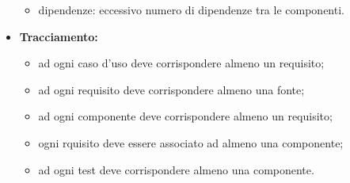 \begin{itemize}
\begin{itemize}
		\item dipendenze: eccessivo numero di dipendenze tra le componenti.
	\end{itemize}
	\item \textbf{Tracciamento:}
	\begin{itemize}
		\item ad ogni caso d'uso deve corrispondere almeno un requisito;
		\item ad ogni requisito deve corrispondere almeno una fonte;
		\item ad ogni componente deve corrispondere almeno un requisito;
		\item ogni rquisito deve essere associato ad almeno una componente;
		\item ad ogni test deve corrispondere almeno una componente.
	\end{itemize}
	
\end{itemize}

